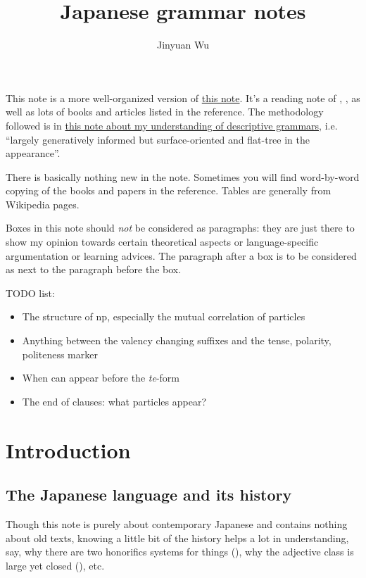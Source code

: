 \documentclass[UTF8, a4paper, oneside, scheme=plain]{ctexrep}
\title{Japanese grammar notes}
\author{Jinyuan Wu}
\newcommand{\corpus}[1]{\emph{#1}}
\newcommand{\method}{\href{../methodology/glossing.pdf}{this note about my understanding of descriptive grammars}}
\begin{document}
\maketitle

\automath

This note is a more well-organized version of \href{./japanese-note-1.pdf}{this note}.
It's a reading note of \citet{akiyama2012japanese}, \citet{tsutsui1989dictionary},
as well as lots of books and articles listed in the reference.
The methodology followed is in \method,
i.e. ``largely generatively informed but surface-oriented and flat-tree in the appearance''.

There is basically nothing new in the note. 
Sometimes you will find word-by-word copying of the books and papers in the reference.
Tables are generally from Wikipedia pages.

Boxes in this note should \emph{not} be considered as paragraphs:
they are just there to show my opinion towards certain theoretical aspects 
or language-specific argumentation
or learning advices.
The paragraph after a box is to be considered as next to the paragraph before the box.

TODO list:
\begin{itemize}
    \item The structure of \acs{np}, especially the mutual correlation of particles
    \item Anything between the valency changing suffixes and the tense, polarity, politeness marker
    \item When can appear before the \corpus{te}-form
    \item The end of clauses: what particles appear?
\end{itemize}

\chapter{Introduction}

\section{The Japanese language and its history}

Though this note is purely about contemporary Japanese and contains nothing about old texts,
knowing a little bit of the history helps a lot in understanding, say,
why there are two honorifics systems for things (),
why the adjective class is large yet closed (), etc.
\end{document}
